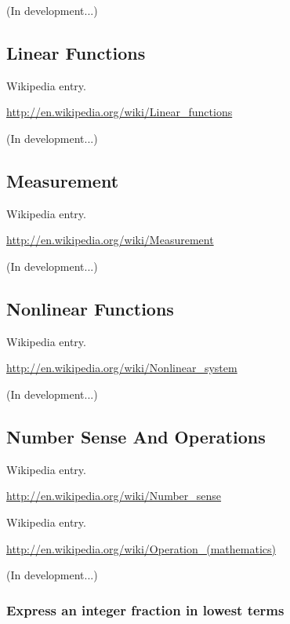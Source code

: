 \documentclass[12pt,oneside]{book}
\begin{document}
(In development...)

\subsection[Linear Functions]{Linear Functions}

Wikipedia entry.

\href{http://en.wikipedia.org/wiki/Linear_functions}{http://en.wikipedia.org/wiki/Linear\_functions}

(In development...)

\subsection[Measurement]{Measurement}

Wikipedia entry.

\href{http://en.wikipedia.org/wiki/Measurement}{http://en.wikipedia.org/wiki/Measurement}

(In development...)

\subsection[Nonlinear Functions]{Nonlinear Functions}

Wikipedia entry.

\href{http://en.wikipedia.org/wiki/Nonlinear_system}{http://en.wikipedia.org/wiki/Nonlinear\_system}

(In development...)

\subsection[Number Sense And Operations]{Number Sense And Operations}

Wikipedia entry.

\href{http://en.wikipedia.org/wiki/Number_sense}{http://en.wikipedia.org/wiki/Number\_sense}


Wikipedia entry.

\href{http://en.wikipedia.org/wiki/Operation_(mathematics)}{http://en.wikipedia.org/wiki/Operation\_(mathematics)}

(In development...)

\subsubsection[Express an integer fraction in lowest terms]{Express an integer fraction in lowest terms}
\end{document}
